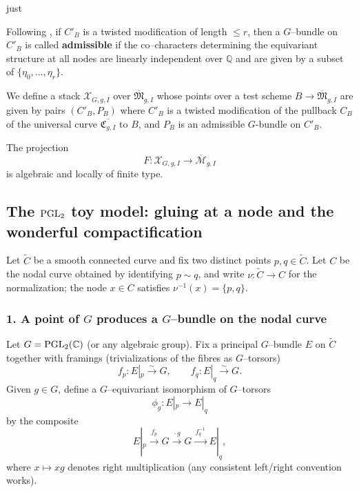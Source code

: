 just \documentclass[12pt]{article}
\begin{document}
Following \cite{solis}, if $C'_B$ is a twisted modification of length $\le r$, then a 
$G$--bundle on $C'_B$ is called \textbf{admissible} if the co--characters determining the 
equivariant structure at all nodes are linearly independent over $\mathbb{Q}$ and are given by 
a subset of $\{\eta_0,\dots,\eta_r\}$.

\begin{definition}
    We define a stack $\mathcal{X}_{G,g,I}$ over $\overline{\mathfrak{M}}_{g,I}$ whose points over a test scheme $B \to \overline{\mathfrak{M}}_{g,I}$ are given by pairs $(C'_B,P_B)$ where $C'_B$ is a twisted modification of the pullback $C_B$ of the universal curve $\overline{\mathfrak{C}_{g,I}}$ to $B$, and $P_B$ is an admissible $G$-bundle on $C'_B$. 
\end{definition}

\begin{proposition}\label{prop:X-algebraic}
The projection
\[
F:\mathcal X_{G,g,I}\to \overline{\mathcal M}_{g,I}
\]
is algebraic and locally of finite type.
\end{proposition}

\subsection{The $\operatorname{PGL}_2$ toy model: gluing at a node and the wonderful compactification}

Let $\widetilde C$ be a smooth connected curve and fix two distinct points
$p,q\in \widetilde C$.  Let $C$ be the nodal curve obtained by identifying
$p\sim q$, and write $\nu:\widetilde C\to C$ for the normalization; the node
$x\in C$ satisfies $\nu^{-1}(x)=\{p,q\}$.

\subsubsection*{1. A point of $G$ produces a $G$--bundle on the nodal curve}

Let $G=\operatorname{PGL}_2(\mathbb{C})$ (or any algebraic group).  Fix a principal $G$--bundle
$E$ on $\widetilde C$ together with framings (trivializations of the fibres as
$G$--torsors)
\[
f_p:E|_p\xrightarrow{\sim} G,
\qquad
f_q:E|_q\xrightarrow{\sim} G.
\]
Given $g\in G$, define a $G$--equivariant isomorphism of $G$--torsors
\[
\phi_g:E|_p\longrightarrow E|_q
\]
by the composite
\[
E|_p \xrightarrow{\,f_p\,} G \xrightarrow{\,\cdot g\,} G \xrightarrow{\,f_q^{-1}\,} E|_q,
\]
where $x\mapsto xg$ denotes right multiplication (any consistent left/right
convention works).
\end{document}
